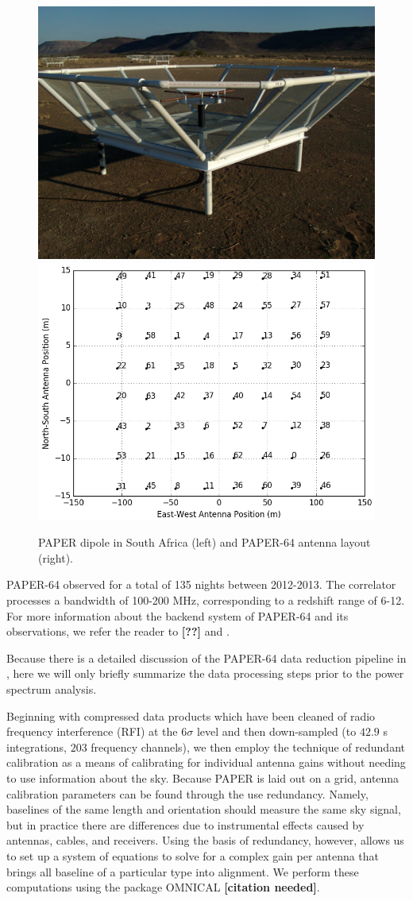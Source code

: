 \documentclass[preprint2,numberedappendix,tighten,twocolappendix]{aastex6}  %
\newcommand{\cc}[1]{{\color{purple} \textbf{[#1]}}}
\begin{document}
\begin{figure}
	\centering
	\includegraphics[height=0.35\textwidth]{plots/paper_dipole.png}
	\includegraphics[height=0.35\textwidth]{plots/antenna_layout.png}
	\caption{PAPER dipole in South Africa (left) and PAPER-64 antenna layout (right).}
	\label{fig:paper}
\end{figure}

PAPER-64 observed for a total of 135 nights between 2012-2013. The correlator processes a bandwidth of 100-200 MHz, corresponding to a redshift range of 6-12. For more information about the backend system of PAPER-64 and its observations, we refer the reader to \cc{??} and \citet{ali_et_al2015}.

Because there is a detailed discussion of the PAPER-64 data reduction pipeline in \citet{ali_et_al2015}, here we will only briefly summarize the data processing steps prior to the power spectrum analysis. 

Beginning with compressed data products which have been cleaned of radio frequency interference (RFI) at the $6\sigma$ level and then down-sampled (to $42.9$ s integrations, $203$ frequency channels), we then employ the technique of redundant calibration as a means of calibrating for individual antenna gains without needing to use information about the sky. Because PAPER is laid out on a grid, antenna calibration parameters can be found through the use redundancy. Namely, baselines of the same length and orientation should measure the same sky signal, but in practice there are differences due to instrumental effects caused by antennas, cables, and receivers. Using the basis of redundancy, however, allows us to set up a system of equations to solve for a complex gain per antenna that brings all baseline of a particular type into alignment. We perform these computations using the package OMNICAL \cc{citation needed}.
\end{document}
